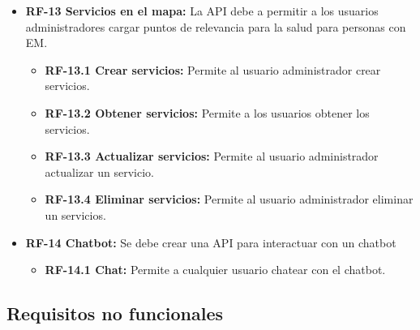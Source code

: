 \begin{itemize}
\tightlist
\item
  \textbf{RF-13 Servicios en el mapa:} La API debe a permitir a los usuarios administradores cargar puntos de relevancia para la salud para personas con EM.\\
  \begin{itemize}
  \tightlist
  \item
    \textbf{RF-13.1 Crear servicios:} Permite al usuario administrador crear servicios. \\
  \item
    \textbf{RF-13.2 Obtener servicios:} Permite a los usuarios obtener los servicios.\\
  \item
    \textbf{RF-13.3 Actualizar servicios:} Permite al usuario administrador actualizar un servicio. \\
  \item
    \textbf{RF-13.4 Eliminar servicios:} Permite al usuario administrador eliminar un servicios.\\
\end{itemize}    
\end{itemize}

\begin{itemize}
\tightlist
\item
  \textbf{RF-14 Chatbot:} Se debe crear una API para interactuar con un chatbot
  \begin{itemize}
  \tightlist
  \item
    \textbf{RF-14.1 Chat:} Permite a cualquier usuario chatear con el chatbot. 
\end{itemize}    
\end{itemize}

\subsection{Requisitos no funcionales}\label{requisitos-no-funcionales}

